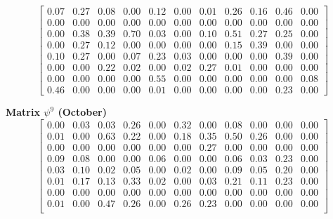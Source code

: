 \documentclass[a4paper,fleqn]{cas-dc}
\begin{document}
\begin{scriptsize}
\[\begin{bmatrix}
0.07 & 0.27 & 0.08 & 0.00 & 0.12 & 0.00 & 0.01 & 0.26 & 0.16 & 0.46 & 0.00\\

0.00 & 0.00 & 0.00 & 0.00 & 0.00 & 0.00 & 0.00 & 0.00 & 0.00 & 0.00 & 0.00\\

0.00 & 0.38 & 0.39 & 0.70 & 0.03 & 0.00 & 0.10 & 0.51 & 0.27 & 0.25 & 0.00\\

0.00 & 0.27 & 0.12 & 0.00 & 0.00 & 0.00 & 0.00 & 0.15 & 0.39 & 0.00 & 0.00\\

0.10 & 0.27 & 0.00 & 0.07 & 0.23 & 0.03 & 0.00 & 0.00 & 0.00 & 0.39 & 0.00\\

0.00 & 0.00 & 0.22 & 0.02 & 0.00 & 0.02 & 0.27 & 0.01 & 0.00 & 0.00 & 0.00\\

0.00 & 0.00 & 0.00 & 0.00 & 0.55 & 0.00 & 0.00 & 0.00 & 0.00 & 0.00 & 0.08\\

0.46 & 0.00 & 0.00 & 0.00 & 0.01 & 0.00 & 0.00 & 0.00 & 0.00 & 0.23 & 0.00

\end{bmatrix}
\]

\textbf{Matrix $\psi^{9}$ (October)}
\[
\begin{bmatrix}

0.00 & 0.03 & 0.03 & 0.26 & 0.00 & 0.32 & 0.00 & 0.08 & 0.00 & 0.00 & 0.00\\

0.01 & 0.00 & 0.63 & 0.22 & 0.00 & 0.18 & 0.35 & 0.50 & 0.26 & 0.00 & 0.00\\

0.00 & 0.00 & 0.00 & 0.00 & 0.00 & 0.00 & 0.27 & 0.00 & 0.00 & 0.00 & 0.00\\

0.09 & 0.08 & 0.00 & 0.00 & 0.06 & 0.00 & 0.00 & 0.06 & 0.03 & 0.23 & 0.00\\

0.03 & 0.10 & 0.02 & 0.05 & 0.00 & 0.02 & 0.00 & 0.09 & 0.05 & 0.20 & 0.00\\

0.01 & 0.17 & 0.13 & 0.33 & 0.02 & 0.00 & 0.03 & 0.21 & 0.11 & 0.23 & 0.00\\

0.00 & 0.00 & 0.00 & 0.00 & 0.00 & 0.00 & 0.00 & 0.00 & 0.00 & 0.00 & 0.00\\

0.01 & 0.00 & 0.47 & 0.26 & 0.00 & 0.26 & 0.23 & 0.00 & 0.00 & 0.00 & 0.00\\


\end{bmatrix}\]
\end{scriptsize}
\end{document}
